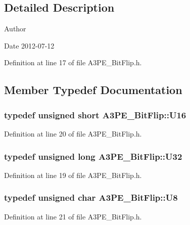 \subsection{Detailed Description}
\begin{DoxyAuthor}{Author}

\end{DoxyAuthor}
\begin{DoxyDate}{Date}
2012-\/07-\/12 
\end{DoxyDate}


Definition at line 17 of file A3PE\_\-BitFlip.h.

\subsection{Member Typedef Documentation}
\hypertarget{classA3PE__BitFlip_a0fa3a1814a6661198e0ce5156d1cc474}{
\subsubsection[{U16}]{\setlength{\rightskip}{0pt plus 5cm}typedef unsigned short {\bf A3PE\_\-BitFlip::U16}}}
\label{classA3PE__BitFlip_a0fa3a1814a6661198e0ce5156d1cc474}


Definition at line 20 of file A3PE\_\-BitFlip.h.\hypertarget{classA3PE__BitFlip_aaf047b5086a5ea11db565ce8283edfb4}{
\subsubsection[{U32}]{\setlength{\rightskip}{0pt plus 5cm}typedef unsigned long {\bf A3PE\_\-BitFlip::U32}}}
\label{classA3PE__BitFlip_aaf047b5086a5ea11db565ce8283edfb4}


Definition at line 19 of file A3PE\_\-BitFlip.h.\hypertarget{classA3PE__BitFlip_ac561e6bbd8d4101ecc32016314a07581}{
\subsubsection[{U8}]{\setlength{\rightskip}{0pt plus 5cm}typedef unsigned char {\bf A3PE\_\-BitFlip::U8}}}
\label{classA3PE__BitFlip_ac561e6bbd8d4101ecc32016314a07581}


Definition at line 21 of file A3PE\_\-BitFlip.h.

